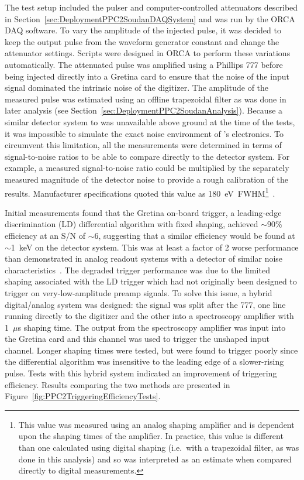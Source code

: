 	The test setup included the pulser and computer-controlled attenuators described in Section~\ref{sec:DeploymentPPC2SoudanDAQSystem} and was run by the ORCA DAQ software.  To vary the amplitude of the injected pulse, it was decided to keep the output pulse from the waveform generator constant and change the attenuator settings.  Scripts were designed in ORCA to perform these variations automatically.  The attenuated pulse was amplified using a Phillips 777 before being injected directly into a Gretina card to ensure that the noise of the input signal dominated the intrinsic noise of the digitizer.  The amplitude of the measured pulse was estimated using an offline trapezoidal filter as was done in later analysis (see Section~\ref{sec:DeploymentPPC2SoudanAnalysis}).  Because a similar detector system to  was unavailable above ground at the time of the tests, it was impossible to simulate the exact noise environment of 's electronics.  To circumvent this limitation, all the measurements were determined in terms of signal-to-noise ratios to be able to compare directly to the detector system.  For example, a measured signal-to-noise ratio could be multiplied by the separately measured magnitude of the detector noise to provide a rough calibration of the results.  Manufacturer specifications quoted this value as 180~eV~FWHM\footnote{This value was measured using an analog shaping amplifier and is dependent upon the shaping times of the amplifier.  In practice, this value is different than one calculated using digital shaping (i.e.~with a trapezoidal filter, as was done in this analysis) and so was interpreted as an estimate when compared directly to digital measurements.}~\cite{Orr2007}.  
	
		Initial measurements found that the Gretina on-board trigger, a leading-edge discrimination (LD) differential algorithm with fixed shaping, achieved $\sim$90\% efficiency at an S/N of $\sim$6, suggesting that a similar efficiency would be found at $\sim$1~keV on the detector system.  This was at least a factor of 2 worse performance than demonstrated in analog readout systems with a detector of similar noise characteristics~\cite{Barb07}.  The degraded trigger performance was due to the limited shaping associated with the LD trigger which had not originally been designed to trigger on very-low-amplitude preamp signals.  To solve this issue, a hybrid digital/analog system was designed: the signal was split after the 777, one line running directly to the digitizer and the other into a spectroscopy amplifier with 1~$\mu$s shaping time.  The output from the spectroscopy amplifier was input into the Gretina card and this channel was used to trigger the unshaped input channel.  Longer shaping times were tested, but were found to trigger poorly since the differential algorithm was insensitive to the leading edge of a slower-rising pulse.  Tests with this hybrid system indicated an improvement of triggering efficiency.  Results comparing the two methods are presented in Figure~\ref{fig:PPC2TriggeringEfficiencyTests}.  
	
